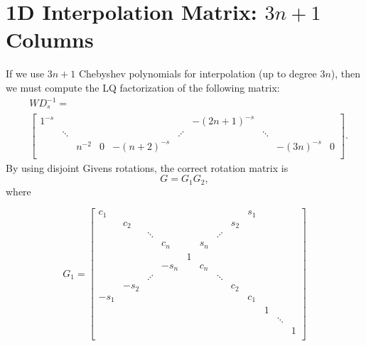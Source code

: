 \section{1D \CV{} Interpolation Matrix: $3n+1$ Columns}
\label{sec:CV_1D_3n}

If we use $3n+1$ Chebyshev polynomials for interpolation
(up to degree $3n$), then we must compute the LQ factorization
of the following matrix:
%
\begin{align}
    &WD_{s}^{-1} = \nonumber\\
    &\begin{bmatrix}
            1^{-s} & & & & & & -(2n+1)^{-s} & \\
                   & \ddots & & & & \iddots & & \ddots & \\
      & & n^{-2} & 0 & -(n+2)^{-s} & & & & -(3n)^{-s} & 0 \\
        \end{bmatrix}.
\end{align}
%
By using disjoint Givens rotations, the correct rotation matrix is
%
\begin{equation}
    G = G_{1}G_{2},
\end{equation}
%
where

\begin{equation}
    G_{1} = \begin{bmatrix}
        c_{1} & & & & & & & & s_{1} \\
        & c_{2} & & & & & & s_{2} & \\
        & & \ddots & & & & \iddots & & \\
        & & & c_{n} & & s_{n} & & & & \\
        & & & & 1 & & & & \\
        & & & -s_{n} & & c_{n} & & & & \\
        & & \iddots & & & & \ddots & & \\
        & -s_{2} & & & & & & c_{2} & \\
        -s_{1} & & & & & & & & c_{1} \\
        & & & & & & & & & 1 \\ 
        & & & & & & & & & & \ddots \\ 
        & & & & & & & & & & & 1 \\ 
    \end{bmatrix}
\end{equation}

